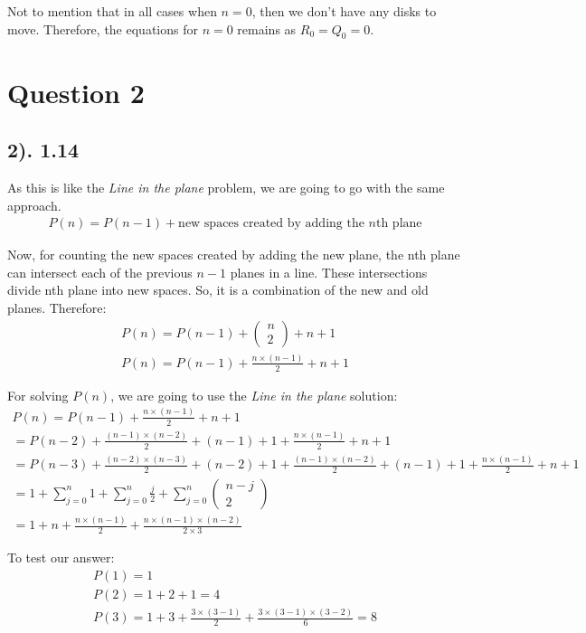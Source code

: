 \documentclass[12pt]{article}
\begin{document}
Not to mention that in all cases when $n=0$, then we don't have any disks to move. Therefore, the equations for $n=0$ remains as $R_{0}=Q_{0}=0$.

\section*{Question 2}
\subsection*{2). 1.14}
As this is like the \textit{Line in the plane} problem, we are going to go with the same approach.
\begin{gather*}
    P(n) = P(n-1) + \text{new spaces created by adding the $n$th plane}
\end{gather*}

Now, for counting the new spaces created by adding the new plane, the nth plane can intersect each of the previous $n-1$ planes in a line.
These intersections divide nth plane into new spaces. So, it is a combination of the new and old planes. Therefore:
\begin{gather*}
    P(n) = P(n-1) + \begin{pmatrix} n \\ 2 \end{pmatrix} + n + 1 \\
    P(n) = P(n-1) + \frac{n \times (n-1)}{2} + n + 1
\end{gather*}

For solving $P(n)$, we are going to use the \textit{Line in the plane} solution:
\begin{gather*}
    P(n) = P(n-1) + \frac{n \times (n-1)}{2} + n + 1 \\
    = P(n-2) + \frac{(n-1) \times (n-2)}{2} + (n-1) + 1 + \frac{n \times (n-1)}{2} + n + 1  \\
    = P(n-3) + \frac{(n-2) \times (n-3)}{2} + (n-2) + 1 + \frac{(n-1) \times (n-2)}{2} + (n-1) + 1 + \frac{n \times (n-1)}{2} + n + 1  \\
    = 1 + \sum_{j=0}^n 1 + \sum_{j=0}^n \frac{j}{2} + \sum_{j=0}^n \begin{pmatrix} n-j \\ 2 \end{pmatrix} \\
    = 1 + n + \frac{n \times (n-1)}{2} + \frac{n \times (n-1) \times (n-2)}{2 \times 3}
\end{gather*}

To test our answer:
\begin{gather*}
    P(1) = 1 \\
    P(2) = 1 + 2 + 1 = 4 \\
    P(3) = 1 + 3 + \frac{3 \times (3-1)}{2} + \frac{3 \times (3-1) \times (3-2)}{6} = 8
\end{gather*}
\end{document}
